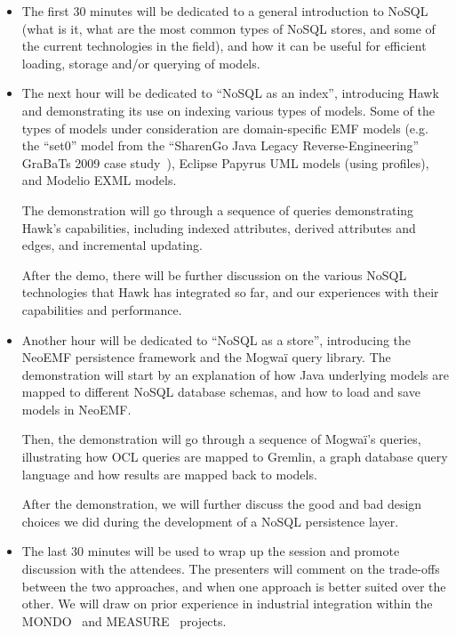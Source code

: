 \documentclass[conference]{IEEEtran}
\newcommand{\todo}[1]{{\color{red}#1}}
\begin{document}
\begin{itemize}
\item The first 30 minutes will be dedicated to a general introduction to
  NoSQL (what is it, what are the most common types of NoSQL stores, and
  some of the current technologies in the field), and how it can be useful for
  efficient loading, storage and/or querying of models.

\item The next hour will be dedicated to ``NoSQL as an index'', introducing Hawk
  and demonstrating its use on indexing various types of models. Some of the
  types of models under consideration are domain-specific EMF models (e.g. the
  ``set0'' model from the ``SharenGo Java Legacy Reverse-Engineering'' GraBaTs
  2009 case study~\cite{Grabats2009}), Eclipse Papyrus UML models (using
  profiles), and Modelio EXML models.

  The demonstration will go through a sequence of queries demonstrating Hawk's
  capabilities, including indexed attributes, derived attributes and edges, and
  incremental updating.

  After the demo, there will be further discussion on the various NoSQL
  technologies that Hawk has integrated so far, and our experiences with their
  capabilities and performance.

\item Another hour will be dedicated to ``NoSQL as a store'', introducing the NeoEMF persistence framework and the Mogwaï query library. 
The demonstration will start by an explanation of how Java underlying models are mapped to different NoSQL database schemas,
and how to load and save models in NeoEMF.

Then, the demonstration will go through a sequence of Mogwa\"i's queries, illustrating how OCL queries are mapped to Gremlin,
a graph database query language and how results are mapped back to models.

After the demonstration, we will further discuss the good and bad design choices we did during the development of a NoSQL persistence layer.


\item The last 30 minutes will be used to wrap up the session and promote
  discussion with the attendees. The presenters will comment on the trade-offs
  between the two approaches, and when one approach is better suited over the
  other. We will draw on prior experience in industrial integration within the
  MONDO~\cite{kolovos_mondo_2016} and MEASURE~\cite{hawk-moma3n18}
  projects.
\end{itemize}
\end{document}
